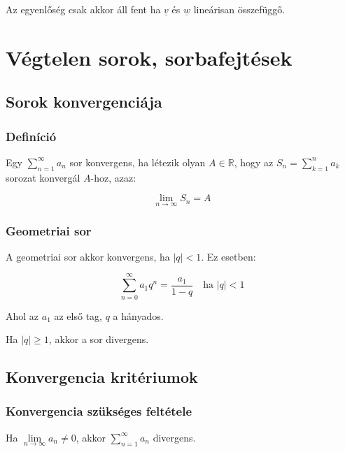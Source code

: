 \documentclass{article}
\begin{document}
Az egyenlőség csak akkor áll fent ha $\underline{v}$ és $\underline{w}$ lineárisan összefüggő.

\newpage

\section{Végtelen sorok, sorbafejtések}

\subsection{Sorok konvergenciája}

\subsubsection{Definíció}

Egy $\sum_{n=1}^\infty a_n$ sor konvergens, ha létezik olyan $A \in \mathbb{R}$, hogy az $S_n = \sum_{k=1}^{n} a_k$ sorozat konvergál $A$-hoz, azaz:

\begin{equation*}
    \lim_{n \to \infty} S_n = A
\end{equation*}

\subsubsection{Geometriai sor}

A geometriai sor akkor konvergens, ha $\left\lvert q \right\rvert < 1$. Ez esetben:

\begin{equation*}
    \sum_{n=0}^{\infty} a_1 q^n = \frac{a_1}{1-q} \quad \text{ha } \left\lvert q \right\rvert < 1
\end{equation*}

Ahol az $a_1$ az első tag, $q$ a hányados.

Ha $\left\lvert q \right\rvert \geq 1$, akkor a sor divergens.

\subsection{Konvergencia kritériumok}

\subsubsection{Konvergencia szükséges feltétele}

Ha $\lim\limits_{n\rightarrow\infty} a_n \neq 0$, akkor  $\sum_{n=1}^{\infty} a_n$ divergens.
\end{document}
